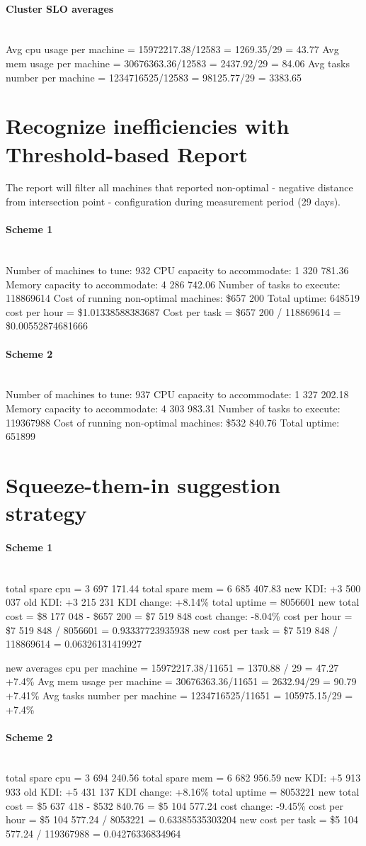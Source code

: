 \documentclass[]{final_report}
\newcommand{\myparagraph}[1]{\paragraph{#1}\mbox{}\\}
\begin{document}
\myparagraph{Cluster SLO averages}

Avg cpu usage per machine = 15972217.38/12583 = 1269.35/29 = 43.77
Avg mem usage per machine = 30676363.36/12583 = 2437.92/29 = 84.06
Avg tasks number per machine = 1234716525/12583 = 98125.77/29 = 3383.65


\section{Recognize inefficiencies with Threshold-based Report}

The report will filter all machines that reported non-optimal - negative distance from intersection point - configuration during measurement period (29 days).

\myparagraph{Scheme 1}
Number of machines to tune: 932
CPU capacity to accommodate: 1 320 781.36
Memory capacity to accommodate: 4 286 742.06
Number of tasks to execute: 118869614
Cost of running non-optimal machines: \$657 200
Total uptime: 648519
cost per hour = \$1.01338588383687
Cost per task =  \$657 200 / 118869614 = \$0.00552874681666

\myparagraph{Scheme 2}
Number of machines to tune: 937
CPU capacity to accommodate: 1 327 202.18
Memory capacity to accommodate: 4 303 983.31
Number of tasks to execute: 119367988
Cost of running non-optimal machines: \$532 840.76
Total uptime: 651899


\section{Squeeze-them-in suggestion strategy}

\myparagraph{Scheme 1}
total spare cpu = 3 697 171.44
total spare mem = 6 685 407.83
new KDI: +3 500 037
old KDI: +3 215 231
KDI change: +8.14\%
total uptime = 8056601
new total cost = \$8 177 048 - \$657 200 = \$7 519 848
cost change: -8.04\%
cost per hour = \$7 519 848 / 8056601 = 0.93337723935938
new cost per task = \$7 519 848 / 118869614 = 0.06326131419927

new averages 
cpu per machine = 15972217.38/11651 = 1370.88 / 29 = 47.27 +7.4\%
Avg mem usage per machine = 30676363.36/11651 = 2632.94/29 = 90.79 +7.41\%
Avg tasks number per machine = 1234716525/11651 = 105975.15/29 = +7.4\%

\myparagraph{Scheme 2}
total spare cpu = 3 694 240.56 
total spare mem = 6 682 956.59
new KDI: +5 913 933
old KDI: +5 431 137
KDI change: +8.16\%
total uptime = 8053221
new total cost = \$5 637 418 - \$532 840.76 = \$5 104 577.24
cost change: -9.45\%
cost per hour = \$5 104 577.24 / 8053221 = 0.63385535303204
new cost per task = \$5 104 577.24 / 119367988 = 0.04276336834964
\end{document}

